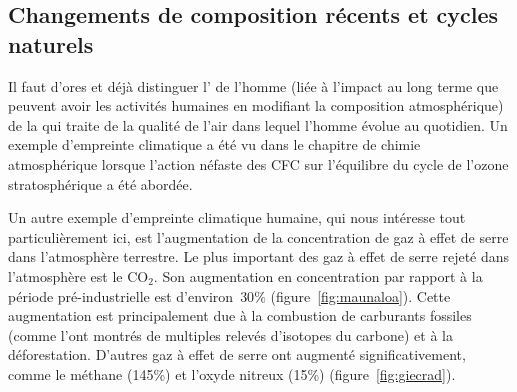 \sk
\subsection{Changements de composition récents et cycles naturels}

\sk
Il faut d'ores et déjà distinguer l' de l'homme (liée à l'impact au long terme que peuvent avoir les activités humaines en modifiant la composition atmosphérique) de la  qui traite de la qualité de l'air dans lequel l'homme évolue au quotidien. Un exemple d'empreinte climatique a été vu dans le chapitre de chimie atmosphérique lorsque l'action néfaste des CFC sur l'équilibre du cycle de l'ozone stratosphérique a été abordée. 

\sk
Un autre exemple d'empreinte climatique humaine, qui nous intéresse tout particulièrement ici, est l'augmenta\-tion de la concentration de gaz à effet de serre dans l'atmosphère terrestre. Le plus important des gaz à effet de serre rejeté dans l'atmosphère est le CO$_2$. Son augmentation en concentration par rapport à la période pré-industrielle est d'environ~$30\%$ (figure~\ref{fig:maunaloa}). Cette augmentation est principalement due à la combustion de carburants fossiles (comme l'ont montrés de multiples relevés d'isotopes du carbone) et à la déforestation. D'autres gaz à effet de serre ont augmenté significativement, comme le méthane (145\%) et l'oxyde nitreux (15\%) (figure~\ref{fig:giecrad}).


